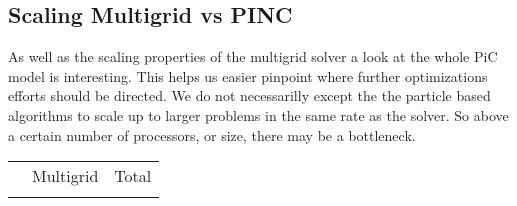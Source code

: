 \subsection{Scaling Multigrid vs PINC}
	As well as the scaling properties of the multigrid solver a look at the
	whole PiC model is interesting. This helps us easier pinpoint where further
	optimizations efforts should be directed. We do not necessarilly except the
	the particle based algorithms to scale up to larger problems in the same
	rate as	the solver. So above a certain number of processors, or size, there may
	be a bottleneck.

	\begin{table}
		\begin{tabular}{c | c | c}
		&	Multigrid & Total\\
		\\ \hline 
		\end{tabular}
	\end{table}
